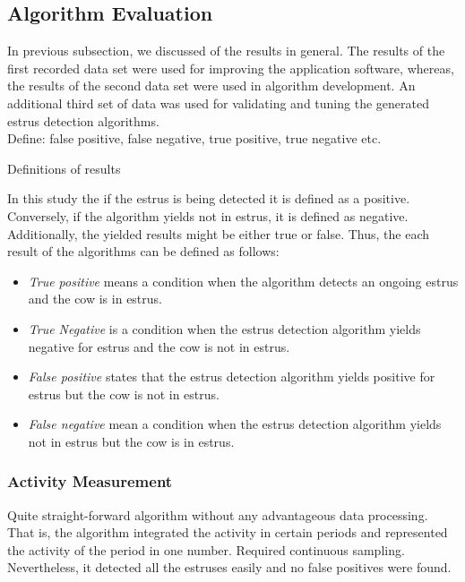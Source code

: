 \documentclass[english,12pt,a4paper,pdftex,elec,utf8]{aaltothesis}
\begin{document}
\subsection{Algorithm Evaluation} \label{algorithmevaluationsection}

In previous subsection, we discussed of the results in general. The results of the first recorded data set were used for improving the application software, whereas, the results of the second data set were used in algorithm development. An additional third set of data was used for validating and tuning the generated estrus detection algorithms. \\

Define: false positive, false negative, true positive, true negative etc.

Definitions of results

In this study the if the estrus is being detected it is defined as a positive. Conversely, if the algorithm yields not in estrus, it is defined as negative. Additionally, the yielded results might be either true or false. Thus, the each result of the algorithms can be defined as follows:

\begin{itemize}
\item \textit{True positive} means a condition when the algorithm detects an ongoing estrus and the cow is in estrus.
\item \textit{True Negative} is a condition when the estrus detection algorithm yields negative for estrus and the cow is not in estrus.
\item \textit{False positive} states that the estrus detection algorithm yields positive for estrus but the cow is not in estrus.
\item \textit{False negative} mean a condition when the estrus detection algorithm yields not in estrus but the cow is in estrus.
\end{itemize}

\subsubsection{Activity Measurement} \label{activitymeasurementevaluation}

Quite straight-forward algorithm without any advantageous data processing. That is, the algorithm integrated the activity in certain periods and represented the activity of the period in one number. Required continuous sampling. Nevertheless, it detected all the estruses easily and no false positives were found. \\
\end{document}
